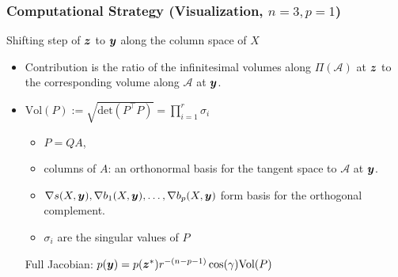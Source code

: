 \documentclass{beamer}
\newcommand{\by}{\mbox{\boldmath $y$}}
\newcommand{\bz}{\mbox{\boldmath $z$}}
\newcommand{\mc}{\mathcal}
\begin{document}
\begin{frame}
	\frametitle{Computational Strategy (Visualization, $n=3, p=1$)}
  	Shifting step of $\bz$ to $\by$ along the column space of $X$
	\begin{itemize}
		\item Contribution is the ratio of the infinitesimal volumes along $\Pi(\mathcal{A})$ at $\bz$ to the
		corresponding volume along $\mathcal{A}$ at $\by$. 
		\item $\text{Vol} (P) := \sqrt{\text{det}(P^\top P)}=\prod_{i=1}^{r} \sigma_i$
		\begin{itemize}
			\item $P = QA$, 
			\item columns of $A$: an orthonormal basis for the tangent
			space to $\mc A$ at $\by$. 
			\item $\nabla s(X,\by), \nabla b_1(X,\by),\dots, \nabla b_p(X,\by)$ form basis for the orthogonal complement.
			\item $\sigma_i$ are the singular values of $P$
		\end{itemize}
	Full Jacobian: $p(\by)=p(\bz^*) r^{-(n-p-1)} \cos(\gamma)\text{Vol} (P)$
	\end{itemize}
	
\end{frame}
\end{document}
